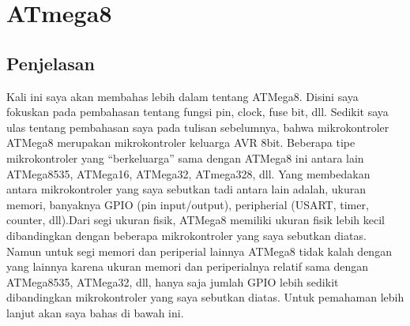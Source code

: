 \section{ATmega8}

	\subsection{Penjelasan}
		Kali ini saya akan membahas lebih dalam tentang ATMega8. Disini saya fokuskan pada pembahasan tentang fungsi pin, clock, fuse bit, dll.
		Sedikit saya ulas tentang pembahasan saya pada tulisan sebelumnya, bahwa mikrokontroler ATMega8 merupakan mikrokontroler keluarga AVR 8bit. Beberapa tipe mikrokontroler yang “berkeluarga” sama dengan ATMega8 ini antara lain ATMega8535, ATMega16, ATMega32, ATmega328, dll. Yang membedakan antara mikrokontroler yang saya sebutkan tadi antara lain adalah, ukuran memori, banyaknya GPIO (pin input/output), peripherial (USART, timer, counter, dll).Dari segi ukuran fisik, ATMega8 memiliki ukuran fisik lebih kecil dibandingkan dengan beberapa mikrokontroler yang saya sebutkan diatas. Namun untuk segi memori dan periperial lainnya ATMega8 tidak kalah dengan yang lainnya karena ukuran memori dan periperialnya relatif sama dengan ATMega8535, ATMega32, dll, hanya saja jumlah GPIO lebih sedikit dibandingkan mikrokontroler yang saya sebutkan diatas. Untuk pemahaman lebih lanjut akan saya bahas di bawah ini.